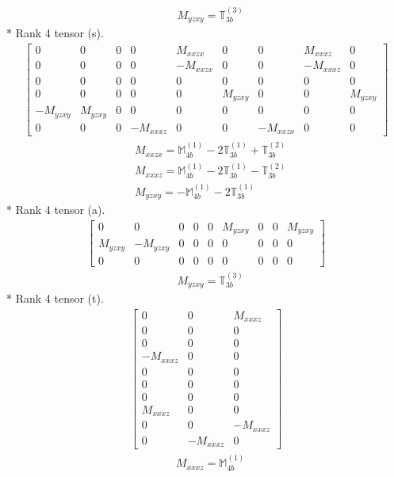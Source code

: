 \documentclass[fleqn,8pt,landscape]{jsarticle}
\begin{document}
\begin{align*}
& M_{yzxy} = \mathbb{T}_{3b}^{(3)}
\end{align*}
* Rank 4 tensor (s).
\begin{align*}
\begin{bmatrix} 0 & 0 & 0 & 0 & M_{xxzx} & 0 & 0 & M_{xxxz} & 0 \\ 0 & 0 & 0 & 0 & - M_{xxzx} & 0 & 0 & - M_{xxxz} & 0 \\ 0 & 0 & 0 & 0 & 0 & 0 & 0 & 0 & 0 \\ 0 & 0 & 0 & 0 & 0 & M_{yzxy} & 0 & 0 & M_{yzxy} \\ - M_{yzxy} & M_{yzxy} & 0 & 0 & 0 & 0 & 0 & 0 & 0 \\ 0 & 0 & 0 & - M_{xxxz} & 0 & 0 & - M_{xxzx} & 0 & 0 \end{bmatrix}
\end{align*}
\begin{align*}
& M_{xxzx} = \mathbb{M}_{4b}^{(1)} - 2 \mathbb{T}_{3b}^{(1)} + \mathbb{T}_{3b}^{(2)} \\
& M_{xxxz} = \mathbb{M}_{4b}^{(1)} - 2 \mathbb{T}_{3b}^{(1)} - \mathbb{T}_{3b}^{(2)} \\
& M_{yzxy} = - \mathbb{M}_{4b}^{(1)} - 2 \mathbb{T}_{3b}^{(1)}
\end{align*}
* Rank 4 tensor (a).
\begin{align*}
\begin{bmatrix} 0 & 0 & 0 & 0 & 0 & M_{yzxy} & 0 & 0 & M_{yzxy} \\ M_{yzxy} & - M_{yzxy} & 0 & 0 & 0 & 0 & 0 & 0 & 0 \\ 0 & 0 & 0 & 0 & 0 & 0 & 0 & 0 & 0 \end{bmatrix}
\end{align*}
\begin{align*}
& M_{yzxy} = \mathbb{T}_{3b}^{(3)}
\end{align*}
* Rank 4 tensor (t).
\begin{align*}
\begin{bmatrix} 0 & 0 & M_{xxxz} \\ 0 & 0 & 0 \\ 0 & 0 & 0 \\ - M_{xxxz} & 0 & 0 \\ 0 & 0 & 0 \\ 0 & 0 & 0 \\ 0 & 0 & 0 \\ M_{xxxz} & 0 & 0 \\ 0 & 0 & - M_{xxxz} \\ 0 & - M_{xxxz} & 0 \end{bmatrix}
\end{align*}
\begin{align*}
& M_{xxxz} = \mathbb{M}_{4b}^{(1)}
\end{align*}
\end{document}
